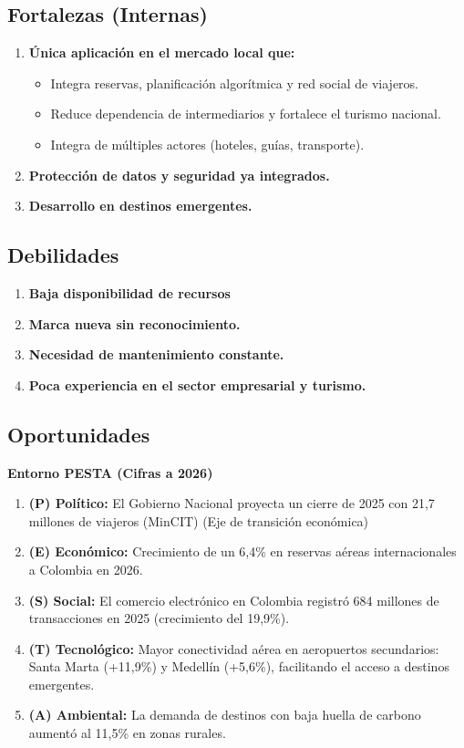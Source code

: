 \documentclass[12pt,a4paper]{article}
\newcommand{\subsectiontitle}[1]{\subsection{#1}}
\begin{document}
\subsectiontitle{Fortalezas (Internas)}

\begin{enumerate}
    \item \textbf{Única aplicación en el mercado local que:}
    \begin{itemize}
        \item Integra reservas, planificación algorítmica y red social de viajeros.
        \item Reduce dependencia de intermediarios y fortalece el turismo nacional.
        \item Integra de múltiples actores (hoteles, guías, transporte).
    \end{itemize}
    \item \textbf{Protección de datos y seguridad ya integrados.}
    \item \textbf{Desarrollo en destinos emergentes.}
\end{enumerate}

\subsectiontitle{Debilidades}

\begin{enumerate}
    \item \textbf{Baja disponibilidad de recursos}
    \item \textbf{Marca nueva sin reconocimiento.}
    \item \textbf{Necesidad de mantenimiento constante.}
    \item \textbf{Poca experiencia en el sector empresarial y turismo.}
\end{enumerate}

\subsectiontitle{Oportunidades}

\textbf{Entorno PESTA (Cifras a 2026)}

\begin{enumerate}
    \item \textbf{(P) Político:} El Gobierno Nacional proyecta un cierre de 2025 con 21,7 millones de viajeros (MinCIT) (Eje de transición económica)
    \item \textbf{(E) Económico:} Crecimiento de un 6,4\% en reservas aéreas internacionales a Colombia en 2026.
    \item \textbf{(S) Social:} El comercio electrónico en Colombia registró 684 millones de transacciones en 2025 (crecimiento del 19,9\%).
    \item \textbf{(T) Tecnológico:} Mayor conectividad aérea en aeropuertos secundarios: Santa Marta (+11,9\%) y Medellín (+5,6\%), facilitando el acceso a destinos emergentes.
    \item \textbf{(A) Ambiental:} La demanda de destinos con baja huella de carbono aumentó al 11,5\% en zonas rurales.
\end{enumerate}
\end{document}
